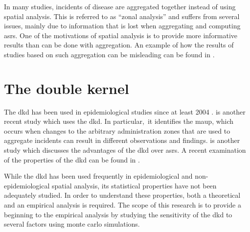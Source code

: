 In many studies,
incidents of disease are aggregated together instead of using spatial analysis.
This is referred to as ``zonal analysis'' and suffers from several issues,
mainly due to information that is lost when aggregating and computing \glspl{asr}.
One of the motivations of spatial analysis is to provide more informative results than can be done with aggregation.
An example of how the results of studies based on such aggregation can be misleading can be found in \citet{portnov2007ecological}.

\section{The double kernel}

The \acrfull{dkd} has been used in epidemiological studies since at least 2004 \citep{rushton2004analyzing}.
\citet{kloog2009using} is another recent study which uses the \gls{dkd}.
In particular,\
it identifies the \gls{maup},
which occurs when changes to the arbitrary administration zones that are used to aggregate incidents can result in different observations and findings.
\citet{zusman2012residential} is another study which discusses the advantages of the \gls{dkd} over \glspl{asr}.
A recent examination of the properties of the \gls{dkd} can be found in \citet{zusman2016application}.

While the \gls{dkd} has been used frequently in epidemiological and non-epidemiological spatial analysis,
its statistical properties have not been adequately studied.
In order to understand these properties,
both a theoretical and an empirical analysis is required.
The scope of this research is to provide a beginning to the empirical analysis by studying the sensitivity of the \gls{dkd} to several factors using monte carlo simulations.

